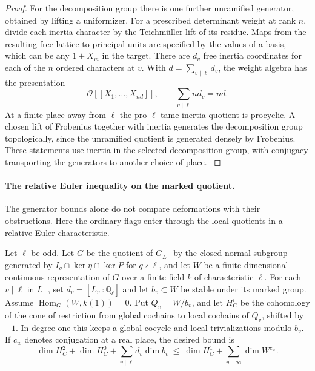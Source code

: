 \begin{proof}
For the decomposition group there is one further unramified
generator, obtained by lifting a uniformizer. For a
prescribed determinant weight at rank \(n\), divide each
inertia character by the Teichm\"uller lift of its residue.
Maps from the resulting free lattice to principal units
are specified by the values of a basis, which can be any
\(1+X_{vi}\) in the target. There are \(d_v\) free inertia coordinates for each of the \(n\) ordered characters at \(v\). With \(d=\sum_{v\mid\ell}d_v\), the weight algebra has the presentation 
\[
 \mathcal O[[X_1,\ldots,X_{nd}]],\qquad \sum_{v\mid\ell}n d_v=nd.
\]
 At a finite place away from \(\ell\) the
pro-\(\ell\) tame inertia quotient is procyclic. A chosen
lift of Frobenius together with inertia generates the
decomposition group topologically, since the unramified
quotient is generated densely by Frobenius. These statements
use inertia in the selected decomposition group, with
conjugacy transporting the generators to another choice of
place. \cite{ray-class,milne-duality}\label{cor:ordinary-fitted-arithmetic-3}

\end{proof}

\paragraph{The relative Euler inequality on the marked quotient.}
The generator bounds alone do not compare deformations with their obstructions. Here
the ordinary flags enter through the local quotients in a relative Euler
characteristic.

\begin{proposition}
\label{prop:fitted-relative-euler}
Let \(\ell\) be odd. Let \(G\) be the quotient of \(G_{L^+}\) by
the closed normal subgroup generated by \(I_q\cap\ker\eta\cap\ker P\)
for \(q\nmid\ell\), and
let \(W\) be a finite-dimensional continuous representation of \(G\)
over a finite field \(k\) of characteristic \(\ell\). For each
\(v\mid\ell\) in \(L^+\), set \(d_v=[L_v^+:\mathbb Q_\ell]\)
and let \(b_v\subset W\) be stable under its marked group.
Assume \(\operatorname{Hom}_{G}(W,k(1))=0\).
Put \(Q_v=W/b_v\), and let \(H_C^i\) be the cohomology of the
cone of restriction from global cochains to local cochains
of \(Q_v\), shifted by \(-1\). In degree one this keeps a
global cocycle and local trivializations modulo \(b_v\).
If \(c_w\) denotes conjugation at a real place, the desired
bound is
\begin{equation}\label{eq:fitted-relative-euler}
 \dim H_C^2+\dim H_C^0+\sum_{v\mid\ell}d_v\dim b_v
 \ \le\ \dim H_C^1+\sum_{w\mid\infty}\dim W^{c_w}.
\end{equation}

\end{proposition}

